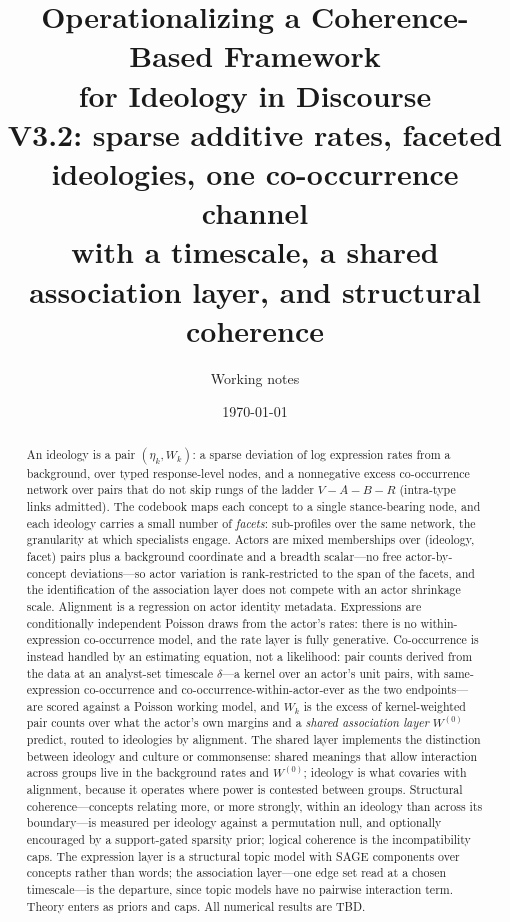 \documentclass[11pt]{article}
\title{\bfseries Operationalizing a Coherence-Based Framework\\ for Ideology in Discourse\\[4pt]
\large V3.2: sparse additive rates, faceted ideologies, one co-occurrence channel\\ \large with a timescale, a shared association layer, and structural coherence}
\author{Working notes}
\date{\today}
\newcommand{\1}{\mathbb{1}}
\begin{document}
\maketitle

\begin{abstract}
\noindent An ideology is a pair $(\eta_k, W_k)$: a sparse deviation of log expression rates from a background, over typed response-level nodes, and a nonnegative excess co-occurrence network over pairs that do not skip rungs of the ladder $V\!-\!A\!-\!B\!-\!R$ (intra-type links admitted). The codebook maps each concept to a single stance-bearing node, and each ideology carries a small number of \emph{facets}: sub-profiles over the same network, the granularity at which specialists engage. Actors are mixed memberships over (ideology, facet) pairs plus a background coordinate and a breadth scalar---no free actor-by-concept deviations---so actor variation is rank-restricted to the span of the facets, and the identification of the association layer does not compete with an actor shrinkage scale. Alignment is a regression on actor identity metadata. Expressions are conditionally independent Poisson draws from the actor's rates: there is no within-expression co-occurrence model, and the rate layer is fully generative. Co-occurrence is instead handled by an estimating equation, not a likelihood: pair counts derived from the data at an analyst-set timescale $\delta$---a kernel over an actor's unit pairs, with same-expression co-occurrence and co-occurrence-within-actor-ever as the two endpoints---are scored against a Poisson working model, and $W_k$ is the excess of kernel-weighted pair counts over what the actor's own margins and a \emph{shared association layer} $W^{(0)}$ predict, routed to ideologies by alignment. The shared layer implements the distinction between ideology and culture or commonsense: shared meanings that allow interaction across groups live in the background rates and $W^{(0)}$; ideology is what covaries with alignment, because it operates where power is contested between groups. Structural coherence---concepts relating more, or more strongly, within an ideology than across its boundary---is measured per ideology against a permutation null, and optionally encouraged by a support-gated sparsity prior; logical coherence is the incompatibility caps. The expression layer is a structural topic model with SAGE components over concepts rather than words; the association layer---one edge set read at a chosen timescale---is the departure, since topic models have no pairwise interaction term. Theory enters as priors and caps. All numerical results are TBD.
\end{abstract}
\end{document}
